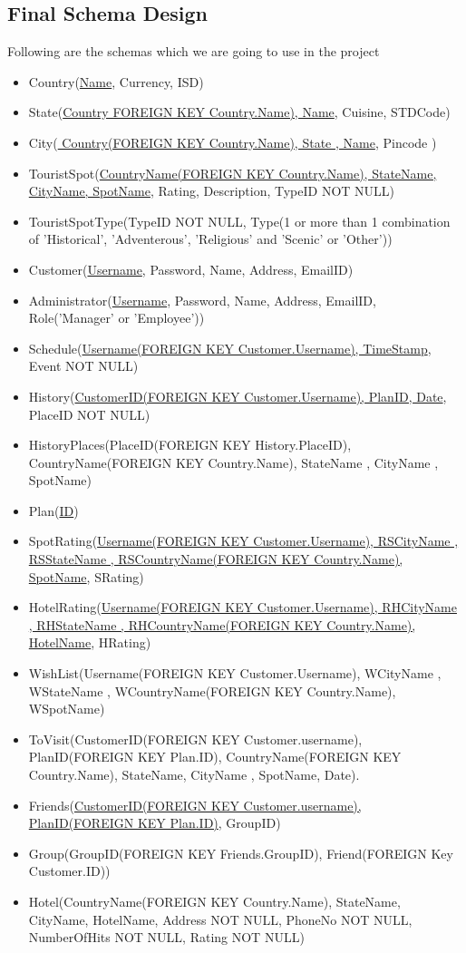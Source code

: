 \documentclass[11pt]{article}
\begin{document}
\subsection{Final Schema Design}
Following are the schemas which we are going to use in the project
\begin{itemize}
\item Country(\underline{Name}, Currency, ISD)
\item State(\underline{Country FOREIGN KEY Country.Name), Name}, Cuisine, STDCode)
\item City(\underline{ Country(FOREIGN KEY Country.Name), State , Name}, Pincode )
\item TouristSpot(\underline{CountryName(FOREIGN KEY Country.Name), StateName, CityName, SpotName}, Rating, Description, TypeID NOT NULL)
\item TouristSpotType(TypeID NOT NULL, Type(1 or more than 1 combination of 'Historical', 'Adventerous', 'Religious' and 'Scenic' or 'Other'))
\item Customer(\underline{Username}, Password, Name, Address, EmailID)
\item Administrator(\underline{Username}, Password, Name, Address, EmailID, Role('Manager' or 'Employee'))
\item Schedule(\underline{Username(FOREIGN KEY Customer.Username), TimeStamp}, Event NOT NULL)
\item History(\underline{CustomerID(FOREIGN KEY Customer.Username), PlanID, Date}, PlaceID NOT NULL)
\item HistoryPlaces(PlaceID(FOREIGN KEY History.PlaceID), CountryName(FOREIGN KEY Country.Name), StateName , CityName , SpotName)
\item Plan(\underline{ID})
\item SpotRating(\underline{Username(FOREIGN KEY Customer.Username), RSCityName , RSStateName , RSCountryName(FOREIGN KEY Country.Name), SpotName}, SRating)

\item HotelRating(\underline{Username(FOREIGN KEY Customer.Username), RHCityName , RHStateName , RHCountryName(FOREIGN KEY Country.Name), HotelName}, HRating)

\item WishList(Username(FOREIGN KEY Customer.Username), WCityName , WStateName , WCountryName(FOREIGN KEY Country.Name), WSpotName)

\item ToVisit(CustomerID(FOREIGN KEY Customer.username), PlanID(FOREIGN KEY Plan.ID), CountryName(FOREIGN KEY Country.Name), StateName, CityName , SpotName, Date).
\item Friends(\underline{CustomerID(FOREIGN KEY Customer.username), PlanID(FOREIGN KEY Plan.ID)}, GroupID)
\item Group(GroupID(FOREIGN KEY Friends.GroupID), Friend(FOREIGN Key Customer.ID))
\item Hotel(CountryName(FOREIGN KEY Country.Name), StateName, CityName, HotelName, Address NOT NULL, PhoneNo NOT NULL, NumberOfHits NOT NULL, Rating NOT NULL)
\end{itemize}
\end{document}
